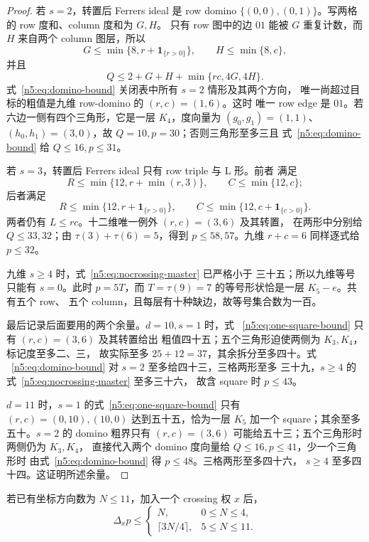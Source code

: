 \begin{proof}
若 \(s=2\)，转置后 Ferrers ideal 是 row domino
\(\{(0,0),(0,1)\}\)。写两格的 row 度和、column 度和为 \(G,H\)。
只有 row 图中的边 \(01\) 能被 \(G\) 重复计数，而 \(H\) 来自两个
column 图层，所以
\[
G\le\min\{8,r+\mathbf1_{\{r>0\}}\},\qquad
H\le\min\{8,c\},
\]
并且
\begin{equation}\label{n5:eq:domino-bound}
 Q\le2+G+H+\min\{rc,4G,4H\}.
\end{equation}
式~\eqref{n5:eq:domino-bound} 关闭表中所有 \(s=2\) 情形及其两个方向，
唯一尚超过目标的粗值是九维 row-domino 的 \((r,c)=(1,6)\)。这时
唯一 row edge 是 \(01\)。若六边一侧有四个三角形，它是一层
\(K_4\)，度向量为 \((g_0,g_1)=(1,1)\)、
\((h_0,h_1)=(3,0)\)，故 \(Q=10,p=30\)；否则三角形至多三且
式~\eqref{n5:eq:domino-bound} 给 \(Q\le16,p\le31\)。

若 \(s=3\)，转置后 Ferrers ideal 只有 row triple 与 L 形。前者
满足
\[
R\le\min\{12,r+\min(r,3)\},\qquad C\le\min\{12,c\};
\]
后者满足
\[
R\le\min\{12,r+\mathbf1_{\{r>0\}}\},\qquad
C\le\min\{12,c+\mathbf1_{\{c>0\}}\}.
\]
两者仍有 \(L\le rc\)。十二维唯一例外 \((r,c)=(3,6)\) 及其转置，
在两形中分别给 \(Q\le33,32\)；由
\(\tau(3)+\tau(6)=5\)，得到 \(p\le58,57\)。九维 \(r+c=6\)
同样逐式给 \(p\le32\)。

九维 \(s\ge4\) 时，式~\eqref{n5:eq:nocrossing-master} 已严格小于
三十五；所以九维等号只能有 \(s=0\)。此时 \(p=5T\)，而
\(T=\tau(9)=7\) 的等号形状恰是一层 \(K_5-e\)。共有五个 row、
五个 column，且每层有十种缺边，故等号集合数为一百。

最后记录后面要用的两个余量。\(d=10,s=1\) 时，式
~\eqref{n5:eq:one-square-bound} 只有 \((r,c)=(3,6)\) 及其转置给出
粗值四十五；五个三角形迫使两侧为 \(K_3,K_4\)，标记度至多二、三，
故实际至多 \(25+12=37\)，其余拆分至多四十。式
~\eqref{n5:eq:domino-bound} 对 \(s=2\) 至多给四十三，三格两形至多
三十九，\(s\ge4\) 的式~\eqref{n5:eq:nocrossing-master} 至多三十六，
故含 square 时 \(p\le43\)。

\(d=11\) 时，\(s=1\) 的式~\eqref{n5:eq:one-square-bound} 只有
\((r,c)=(0,10),(10,0)\) 达到五十五，恰为一层 \(K_5\) 加一个
square；其余至多五十。\(s=2\) 的 domino 粗界只有
\((r,c)=(3,6)\) 可能给五十三；五个三角形时两侧仍为 \(K_3,K_4\)，
直接代入两个 domino 度向量给 \(Q\le16,p\le41\)，少一个三角形时
由式~\eqref{n5:eq:domino-bound} 得 \(p\le48\)。三格两形至多四十六，
\(s\ge4\) 至多四十四。这证明所述余量。
\end{proof}

\begin{lemma}\label{n5:lem:crossdensity}
若已有坐标方向数为 \(N\le11\)，加入一个 crossing 权 \(x\) 后，
\[
 \Delta_xp\le
 \begin{cases}
 N,&0\le N\le4,\\
 \lceil3N/4\rceil,&5\le N\le11.
 \end{cases}                                                   \tag{CM}
\]
\end{lemma}

